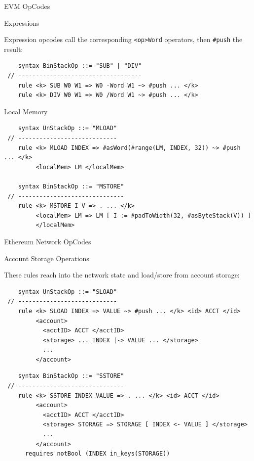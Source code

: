 \documentclass[8pt,ignorenonframetext,]{beamer}
\begin{document}
\begin{frame}[fragile]{EVM OpCodes}

\pause

\begin{block}{Expressions}

Expression opcodes call the corresponding
\texttt{\textless{}op\textgreater{}Word} operators, then \texttt{\#push}
the result:

\begin{verbatim}
    syntax BinStackOp ::= "SUB" | "DIV"
 // -----------------------------------
    rule <k> SUB W0 W1 => W0 -Word W1 ~> #push ... </k>
    rule <k> DIV W0 W1 => W0 /Word W1 ~> #push ... </k>
\end{verbatim}

\pause

\end{block}

\begin{block}{Local Memory}

\begin{verbatim}
    syntax UnStackOp ::= "MLOAD"
 // ----------------------------
    rule <k> MLOAD INDEX => #asWord(#range(LM, INDEX, 32)) ~> #push ... </k>
         <localMem> LM </localMem>

    syntax BinStackOp ::= "MSTORE"
 // ------------------------------
    rule <k> MSTORE I V => . ... </k>
         <localMem> LM => LM [ I := #padToWidth(32, #asByteStack(V)) ]
         </localMem>
\end{verbatim}

\end{block}

\end{frame}

\begin{frame}[fragile]{Ethereum Network OpCodes}

\pause

\begin{block}{Account Storage Operations}

These rules reach into the network state and load/store from account
storage:

\begin{verbatim}
    syntax UnStackOp ::= "SLOAD"
 // ----------------------------
    rule <k> SLOAD INDEX => VALUE ~> #push ... </k> <id> ACCT </id>
         <account>
           <acctID> ACCT </acctID>
           <storage> ... INDEX |-> VALUE ... </storage>
           ...
         </account>
\end{verbatim}

\pause

\begin{verbatim}
    syntax BinStackOp ::= "SSTORE"
 // ------------------------------
    rule <k> SSTORE INDEX VALUE => . ... </k> <id> ACCT </id>
         <account>
           <acctID> ACCT </acctID>
           <storage> STORAGE => STORAGE [ INDEX <- VALUE ] </storage>
           ...
         </account>
      requires notBool (INDEX in_keys(STORAGE))
\end{verbatim}

\end{block}

\end{frame}
\end{document}

